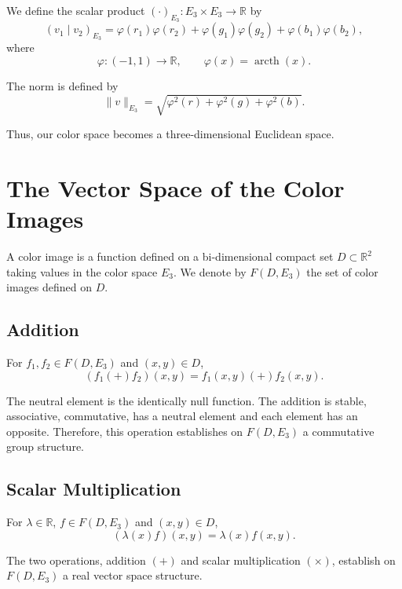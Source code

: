 \documentclass[11pt]{article}
\begin{document}
We define the scalar product $(\cdot)_{E_3}:E_3\times E_3\to\mathbb{R}$ by
\begin{equation}
(v_1\mid v_2)_{E_3}
= \varphi(r_1)\varphi(r_2)+\varphi(g_1)\varphi(g_2)+\varphi(b_1)\varphi(b_2),
\end{equation}
where
\[
\varphi:(-1,1)\to\mathbb{R}, \qquad \varphi(x)=\operatorname{arcth}(x).
\]

The norm is defined by
\begin{equation}
\|v\|_{E_3}=\sqrt{\varphi^2(r)+\varphi^2(g)+\varphi^2(b)}.
\end{equation}

Thus, our color space becomes a three-dimensional Euclidean space.

\section{The Vector Space of the Color Images}

A color image is a function defined on a bi-dimensional compact set $D\subset \mathbb{R}^2$ taking values in the color space $E_3$. We denote by $F(D,E_3)$ the set of color images defined on $D$.

\subsection{Addition}

For $f_1,f_2\in F(D,E_3)$ and $(x,y)\in D$,
\begin{equation}
(f_1(+ )f_2)(x,y)=f_1(x,y)(+ )f_2(x,y).
\end{equation}

The neutral element is the identically null function. The addition is stable, associative, commutative, has a neutral element and each element has an opposite. Therefore, this operation establishes on $F(D,E_3)$ a commutative group structure.

\subsection{Scalar Multiplication}

For $\lambda\in\mathbb{R}$, $f\in F(D,E_3)$ and $(x,y)\in D$,
\begin{equation}
(\lambda(x)f)(x,y)=\lambda(x)f(x,y).
\end{equation}

The two operations, addition $(+)$ and scalar multiplication $(\times)$, establish on $F(D,E_3)$ a real vector space structure.
\end{document}
